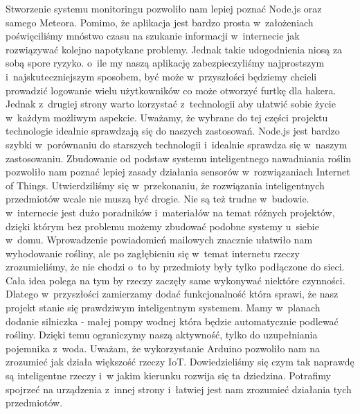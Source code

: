 \documentclass{xmgr}
\begin{document}
\summary
	Stworzenie systemu monitoringu pozwoliło nam lepiej poznać Node.js oraz samego Meteora. Pomimo, że aplikacja jest bardzo prosta w~założeniach poświęciliśmy mnóstwo czasu na szukanie informacji w~internecie jak rozwiązywać kolejno napotykane problemy. Jednak takie udogodnienia niosą za sobą spore ryzyko. o~ile my naszą aplikację zabezpieczyliśmy najprostszym i~najskuteczniejszym sposobem, być może w~przyszłości będziemy chcieli prowadzić logowanie wielu użytkowników co może otworzyć furtkę dla hakera. Jednak z~drugiej strony warto korzystać z~technologii aby ułatwić sobie życie w~każdym możliwym aspekcie. 
	Uważamy, że wybrane do tej części projektu technologie idealnie sprawdzają się do naszych zastosowań. Node.js jest bardzo szybki w~porównaniu do starszych technologii i~idealnie sprawdza się w~naszym zastosowaniu.
	Zbudowanie od podstaw systemu inteligentnego nawadniania roślin pozwoliło nam poznać lepiej zasady działania sensorów w~rozwiązaniach Internet of Things. Utwierdziliśmy się w~przekonaniu, że rozwiązania inteligentnych przedmiotów wcale nie muszą być drogie. Nie są też trudne w~budowie. w~internecie jest dużo poradników i~materiałów na temat różnych projektów, dzięki którym bez problemu możemy zbudować podobne systemy u~siebie w~domu. 
	Wprowadzenie powiadomień mailowych znacznie ułatwiło nam wyhodowanie rośliny, ale po zagłębieniu się w~temat internetu rzeczy zrozumieliśmy, że nie chodzi o~to by przedmioty były tylko podłączone do sieci. Cała idea polega na tym by rzeczy zaczęły same wykonywać niektóre czynności. Dlatego w~przyszłości zamierzamy dodać funkcjonalność która sprawi, że nasz projekt stanie się prawdziwym inteligentnym systemem. Mamy w~planach dodanie silniczka - małej pompy wodnej która będzie automatycznie podlewać rośliny. Dzięki temu ograniczymy naszą aktywność, tylko do uzupełniania pojemnika z~woda. 
	Uważam, że wykorzystanie Arduino pozwoliło nam na zrozumieć jak działa większość rzeczy IoT. Dowiedzieliśmy się czym tak naprawdę są inteligentne rzeczy i~w jakim kierunku rozwija się ta dziedzina. Potrafimy spojrzeć na urządzenia z~innej strony i~łatwiej jest nam zrozumieć działania tych przedmiotów.

\appendix





\listoffigures

\oswiadczenie
\end{document}
